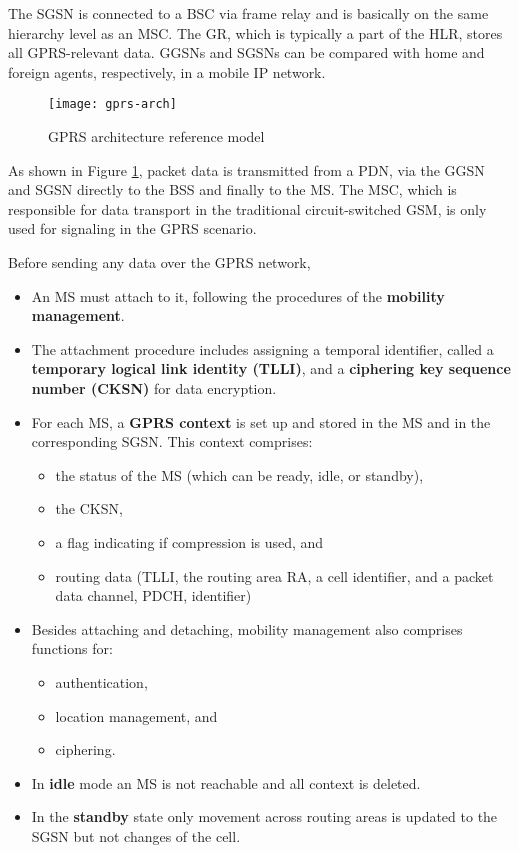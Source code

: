  \noindent The SGSN is connected to a BSC via frame relay and is basically on the same hierarchy level as an MSC. The GR, which is typically a part of the HLR, stores all GPRS-relevant data. GGSNs and SGSNs can be compared with home and foreign agents, respectively, in a mobile IP network.
 
\begin{figure}[H]
	\centering
	\texttt{[image: gprs-arch]}
	\caption{GPRS architecture reference model}\label{fig:gprs-arch}
\end{figure}
As shown in Figure \ref{fig:gprs-arch}, packet data is transmitted from a PDN, via the GGSN and SGSN directly to the BSS and finally to the MS. The MSC, which is responsible for data transport in the traditional circuit-switched GSM, is only used for signaling in the GPRS scenario.


Before sending any data over the GPRS network, 
\begin{itemize}
	\item An MS must attach to it, following the procedures of the \textbf{mobility management}. 
	\item The attachment procedure includes assigning a temporal identifier, called a \textbf{temporary logical link identity (TLLI)}, and a \textbf{ciphering key sequence number (CKSN)} for data encryption. 
	\item For each MS, a \textbf{GPRS context} is set up and stored in the MS and in the corresponding SGSN. This context comprises:
	\begin{itemize}
		\item the status of the MS (which can be ready, idle, or standby), 
		\item the CKSN, 
		\item a flag indicating if compression is used, and 
		\item routing data (TLLI, the routing area RA, a cell identifier, and a packet data channel, PDCH, identifier)
	\end{itemize}
 \item Besides attaching and detaching, mobility management also comprises functions for:
 	\begin{itemize}
 		\item authentication, 
 		\item location management, and 
 		\item ciphering.
 	\end{itemize} 
 \item In \textbf{idle} mode an MS is not reachable and all context is deleted.
 \item In the \textbf{standby} state only movement across routing areas is updated to the SGSN but not changes of the cell.
\end{itemize}


